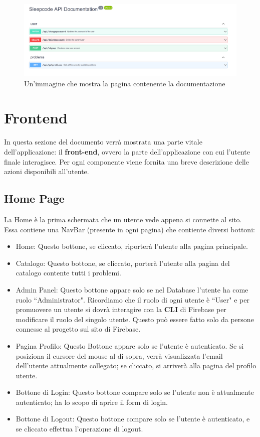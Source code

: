 \documentclass[11pt, a4paper]{article}
\theoremstyle{definition}
\begin{document}
\begin{figure}[H]
  \centering
  \includegraphics[width=\textwidth]{materiale/API/API-doc.png}
  \caption{Un'immagine che mostra la pagina contenente la documentazione}
  \label{documentazione}
\end{figure}

\newpage
\section{Frontend}
In questa sezione del documento verrà mostrata una parte vitale dell'applicazione: il \textbf{front-end}, ovvero la parte dell'applicazione con cui l'utente finale interagisce.
Per ogni componente viene fornita una breve descrizione delle azioni disponibili all'utente.

\subsection{Home Page}
La Home è la prima schermata che un utente vede appena si connette al sito. Essa contiene una NavBar (presente in ogni pagina) che contiente diversi bottoni:
\begin{itemize}
  \item Home: Questo bottone, se cliccato, riporterà l'utente alla pagina principale.
  \item Catalogo: Questo bottone, se cliccato, porterà l'utente alla pagina del catalogo contente tutti i problemi.
  \item Admin Panel: Questo bottone appare solo se nel Database l'utente ha come ruolo ``Administrator". Ricordiamo che il ruolo di ogni utente è ``User" e per promuovere un utente
  si dovrà interagire con la \textbf{CLI} di Firebase per modificare il ruolo del singolo utente. Questo può essere fatto solo da persone connesse al progetto sul sito di Firebase.
  \item Pagina Profilo: Questo Bottone appare solo se l'utente è autenticato. Se si posiziona il cursore del mouse al di sopra, verrà visualizzata l'email dell'utente attualmente collegato; se cliccato, si arriverà alla pagina del profilo utente.
  \item Bottone di Login: Questo bottone compare solo se l'utente non è attualmente autenticato; ha lo scopo di aprire il form di login.
  \item Bottone di Logout: Questo bottone compare solo se l'utente è autenticato, e se cliccato effettua l'operazione di logout.
\end{itemize}
\end{document}
